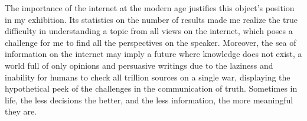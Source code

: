 \documentclass[a4paper,11pt]{article}
\begin{document}

The importance of the internet at the modern age justifies this object's position in my exhibition. Its statistics on the number of results made me realize the true difficulty in understanding a topic from all views on the internet, which poses a challenge for me to find all the perspectives on the speaker. Moreover, the sea of information on the internet may imply a future where knowledge does not exist, a world full of only opinions and persuasive writings due to the laziness and inability for humans to check all trillion sources on a single war, displaying the hypothetical peek of the challenges in the communication of truth. Sometimes in life, the less decisions the better, and the less information, the more meaningful they are.




\nocite{*}
\printbibliography

\end{document}
